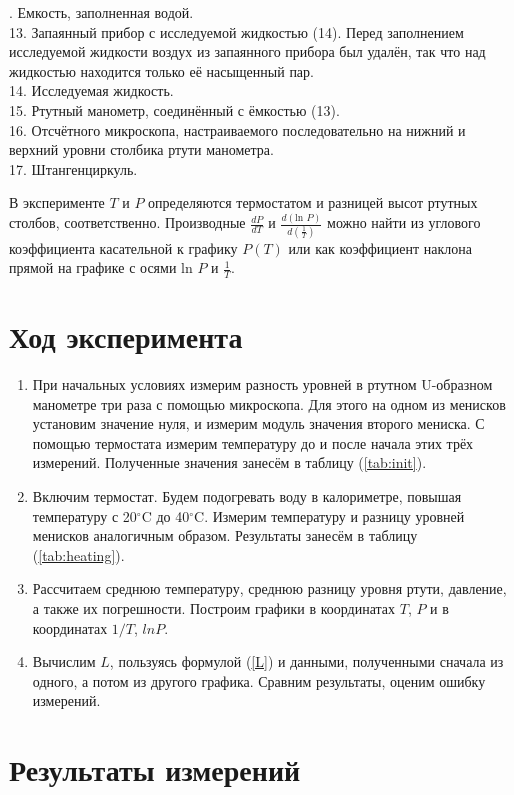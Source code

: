 \documentclass[a4paper,12pt]{article} %
\begin{document}
. Емкость, заполненная водой. \\
13. Запаянный прибор с исследуемой жидкостью (14). 
Перед заполнением исследуемой жидкости воздух из запаянного прибора был удалён, 
так что над жидкостью находится только её насыщенный пар. \\
14. Исследуемая жидкость.\\
15. Ртутный манометр, соединённый с ёмкостью (13). \\
16. Отсчётного микроскопа, настраиваемого последовательно на нижний и верхний 
уровни столбика ртути манометра. \\
17. Штангенциркуль.

\medskip 

\bigskip
В эксперименте $T$ и $P$ определяются термостатом и разницей высот ртутных столбов, соответственно. 
Производные $\frac{dP}{dT}$ и $\frac{d(\mbox{ln }P)}{d(\frac1T)}$ можно найти из углового коэффициента 
касательной к графику $P(T)$ или как коэффициент наклона прямой на графике с осями ln $P$ и $\frac1T$.

\section{Ход эксперимента}

\begin{enumerate}
  \item При начальных условиях измерим разность уровней в ртутном U-образном манометре три раза с помощью микроскопа. 
  Для этого на одном из менисков установим значение нуля, и измерим модуль значения второго мениска. 
  С помощью термостата измерим температуру до и после начала этих трёх измерений. 
  Полученные значения занесём в таблицу (\ref{tab:init}).
  \item Включим термостат. 
  Будем подогревать воду в калориметре, повышая температуру с 20$^\circ$C до 40$^\circ$C. 
  Измерим температуру и разницу уровней менисков аналогичным образом.
  Результаты занесём в таблицу (\ref{tab:heating}).
  \item Рассчитаем среднюю температуру, среднюю разницу уровня ртути, давление, а также их погрешности. 
  Построим графики в координатах $T$, $P$ и в координатах $1/T$, $ln P$.
  \item Вычислим $L$, пользуясь формулой (\ref{L}) и данными, полученными сначала из одного, а потом из другого графика. 
  Сравним результаты, оценим ошибку измерений.
\end{enumerate}
\section{Результаты измерений}
\end{document}
